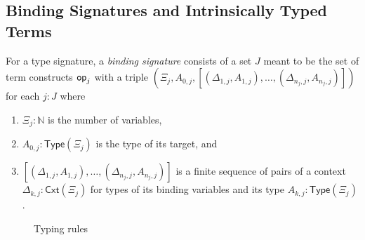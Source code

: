 \documentclass[acmsmall]{acmart}
\begin{document}
\begin{example}[STLC]
  
\end{example}


\subsection{Binding Signatures and Intrinsically Typed Terms}
\begin{definition}
  For a type signature, a \emph{binding signature} consists of a set $J$ meant to be the set of term constructs $\mathsf{op}_{j}$ with a triple $\left(\Xi_j, A_{0, j}, \left[\left(\Delta_{1, j}, A_{1, j}\right), \ldots, \left(\Delta_{n_j, j}, A_{n_j, j}\right) \right]\right)$ for each $j:J$ where
  \begin{enumerate}
    \item $\Xi_j : \mathbb{N}$ is the number of variables, 
    \item $A_{0, j} : \mathsf{Type}(\Xi_j)$ is the type of its target,  and
    \item $\left[\left(\Delta_{1, j}, A_{1, j}\right), \ldots, \left(\Delta_{n_j, j}, A_{n_j, j}\right) \right]$ is a finite sequence of pairs of a context $\Delta_{k, j} : \mathsf{Cxt}(\Xi_j)$ for types of its binding variables and its type $A_{k, j} : \mathsf{Type}(\Xi_j)$.
  \end{enumerate}
\end{definition}
\begin{figure}
  \centering
  
  \caption{Typing rules}
\end{figure}

\begin{example}[STLC]
  
\end{example}
\end{document}
